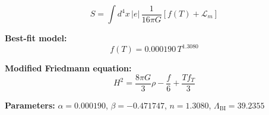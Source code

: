 
\begin{equation}
  S = \int d^4x \, |e| \, \frac{1}{16\pi G} \left[ f(T) + \mathcal{L}_m \right]
\end{equation}

\textbf{Best-fit model:}
\begin{equation}
  f(T) = 0.000190 \, T^{1.3080}
\end{equation}

\textbf{Modified Friedmann equation:}
\begin{equation}
  H^2 = \frac{8\pi G}{3} \rho - \frac{f}{6} + \frac{T f_T}{3}
\end{equation}

\textbf{Parameters:}
$\alpha = 0.000190$, \quad
$\beta = -0.471747$, \quad
$n = 1.3080$, \quad
$\Lambda_{\text{BI}} = 39.2355$